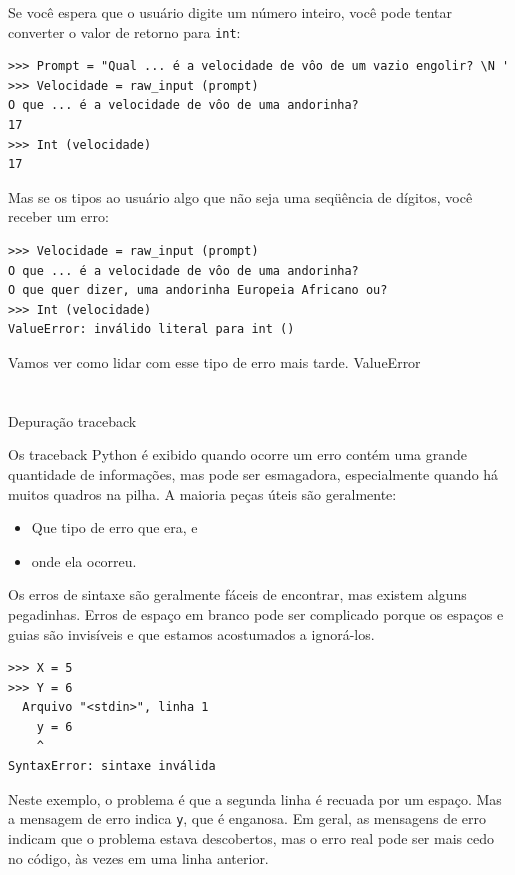 \documentclass[10pt]{book}
\begin{document}
{{Se você espera que o usuário digite um número inteiro, você pode tentar converter
o valor de retorno para {\tt int}:

\begin{verbatim}
>>> Prompt = "Qual ... é a velocidade de vôo de um vazio engolir? \N '
>>> Velocidade = raw_input (prompt)
O que ... é a velocidade de vôo de uma andorinha?
17
>>> Int (velocidade)
17
\end{verbatim}
%
Mas se os tipos ao usuário algo que não seja uma seqüência de dígitos,
você receber um erro:

\begin{verbatim}
>>> Velocidade = raw_input (prompt)
O que ... é a velocidade de vôo de uma andorinha?
O que quer dizer, uma andorinha Europeia Africano ou?
>>> Int (velocidade)
ValueError: inválido literal para int ()
\end{verbatim}
%
Vamos ver como lidar com esse tipo de erro mais tarde.
\index{} ValueError


\section{} Depuração
\label{espaços}
\index{} traceback

Os traceback Python é exibido quando ocorre um erro contém
uma grande quantidade de informações, mas pode ser esmagadora, especialmente
quando há muitos quadros na pilha. A maioria
peças úteis são geralmente:

\begin{itemize}

\item Que tipo de erro que era, e

\item onde ela ocorreu.

\end{itemize}

Os erros de sintaxe são geralmente fáceis de encontrar, mas existem alguns
pegadinhas. Erros de espaço em branco pode ser complicado porque os espaços e
guias são invisíveis e que estamos acostumados a ignorá-los.

\begin{verbatim}
>>> X = 5
>>> Y = 6
  Arquivo "<stdin>", linha 1
    y = 6
    ^
SyntaxError: sintaxe inválida
\end{verbatim}
%
Neste exemplo, o problema é que a segunda linha é recuada por
um espaço. Mas a mensagem de erro indica {\tt y}, que é
enganosa. Em geral, as mensagens de erro indicam que o problema estava
descobertos, mas o erro real pode ser mais cedo no código,
às vezes em uma linha anterior.

}}
\end{document}
